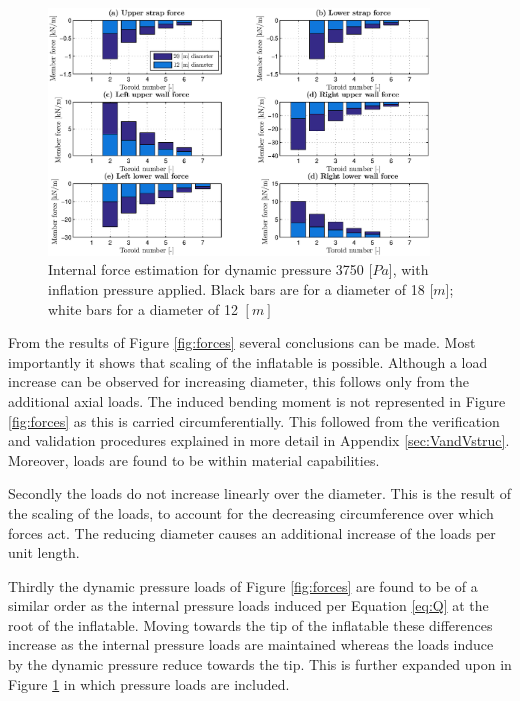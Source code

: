\begin{figure}[ht]
	\centering
	\includegraphics[width=0.9\textwidth]{./Figure/Structure/forces_test.eps}
	\caption[{Internal force estimation for dynamic pressure 3750 [$Pa$], with inflation pressure applied}]{Internal force estimation for dynamic pressure 3750 [$Pa$], with inflation pressure applied. Black bars are for a diameter of 18 [$m$]; white bars for a diameter of 12 $[m]$}
	\label{fig:forcesp}
\end{figure}

From the results of Figure \ref{fig:forces} several conclusions can be made. Most importantly it shows that scaling of the inflatable is possible. Although a load increase can be observed for increasing diameter, this follows only from the additional axial loads. The induced bending moment is not represented in Figure \ref{fig:forces} as this is carried circumferentially. This followed from the verification and validation procedures explained in more detail in Appendix \ref{sec:VandVstruc}. Moreover, loads are found to be within material capabilities.

Secondly the loads do not increase linearly over the diameter. This is the result of the scaling of the loads, to account for the decreasing circumference over which forces act. The reducing diameter causes an additional increase of the loads per unit length.

Thirdly the dynamic pressure loads of Figure \ref{fig:forces} are found to be of a similar order as the internal pressure loads induced per Equation \ref{eq:Q} at the root of the inflatable. Moving towards the tip of the inflatable these differences increase as the internal pressure loads are maintained whereas the loads induce by the dynamic pressure reduce towards the tip. This is further expanded upon in Figure \ref{fig:forcesp} in which pressure loads are included.

